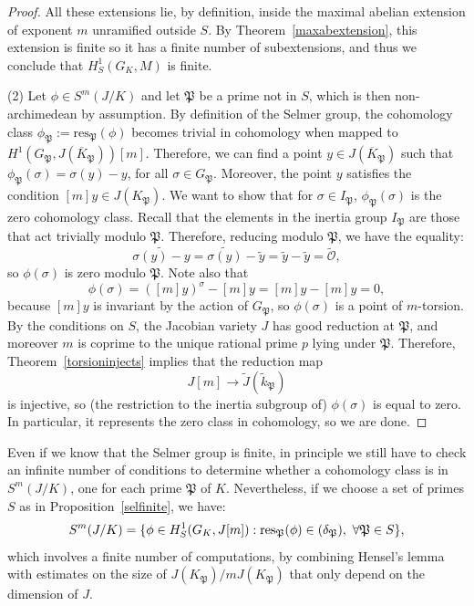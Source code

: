\documentclass[a4paper, 12pt]{amsart}
\theoremstyle{definition}
\theoremstyle{plain}
\theoremstyle{plain}
\theoremstyle{plain}
\theoremstyle{plain}
\theoremstyle{remark}
\theoremstyle{remark}
\theoremstyle{plain}
\newcommand{\propref}[1]{Proposition~\ref{#1}}
\newcommand{\thmref}[1]{Theorem~\ref{#1}}
\renewcommand{\P}{\mathfrak{P}}
\let\Im\relax
\DeclareMathOperator{\Im}{Im}
\begin{document}
\begin{proof}
			All these extensions lie, by definition, inside the maximal abelian extension of exponent $m$ unramified outside $S$. By \thmref{maxabextension}, this extension is finite so it has a finite number of subextensions, and thus we conclude that $H^1_S(G_K,M)$ is finite.
			
			
			(2) Let $\phi\in S^m(J/K)$ and let $\P$ be a prime not in $S$, which is then non-archimedean by assumption. By definition of the Selmer group, the cohomology class $\phi_\P:=\text{res}_\P(\phi)$ becomes trivial in cohomology when mapped to $H^1(G_\P,J(\overline{K}_\P))[m]$. Therefore, we can find a point $y\in J(\overline{K}_\P)$ such that $\phi_\P(\sigma)=\sigma(y)-y$, for all $\sigma\in G_\P$. Moreover, the point $y$ satisfies the condition $[m]y\in J(K_\P)$. We want to show that for $\sigma\in I_\P$, $\phi_\P(\sigma)$ is the zero cohomology class. Recall that the elements in the inertia group $I_\P$ are those that act trivially modulo $\P$. Therefore, reducing modulo $\P$, we have the equality:
			\begin{equation*}
				\widetilde{\sigma(y)-y}=\widetilde{\sigma(y)}-\widetilde{y}=\widetilde{y}-\widetilde{y}=\widetilde{\mathcal{O}},
			\end{equation*}
			so $\phi(\sigma)$ is zero modulo $\P$. Note also that
			\begin{equation*}
				[m]\phi(\sigma)=([m]y)^\sigma-[m]y=[m]y-[m]y=0,
			\end{equation*}
			because $[m]y$ is invariant by the action of $G_\P$, so $\phi(\sigma)$ is a point of $m$-torsion. By the conditions on $S$, the Jacobian variety $J$ has good reduction at $\P$, and moreover $m$ is coprime to the unique rational prime $p$ lying under $\P$. Therefore, \thmref{torsioninjects} implies that the reduction map
			\begin{equation*}
				J[m]\rightarrow \tilde{J}(\widetilde{k}_\P)
			\end{equation*}
			is injective, so (the restriction to the inertia subgroup of) $\phi(\sigma)$ is equal to zero. In particular, it represents the zero class in cohomology, so we are done.
	\end{proof}
	Even if we know that the Selmer group is finite, in principle we still have to check an infinite number of conditions to determine whether a cohomology class is in $S^m(J/K)$, one for each prime $\P$ of $K$. Nevertheless, if we choose a set of primes $S$ as in \propref{selfinite}, we have:
	\begin{equation*}
		S^m(J/K)=\{\phi\in H^1_S(G_K,J[m]):\text{res}_\P(\phi)\in \Im(\delta_\P), \ \forall \P\in S\},
	\end{equation*}
	which involves a finite number of computations, by combining Hensel's lemma with estimates on the size of $J(K_\P)/mJ(K_\P)$ that only depend on the dimension of $J$.
	
\end{document}
